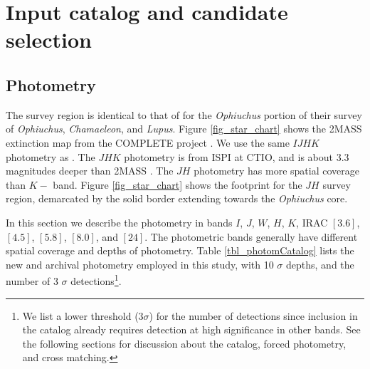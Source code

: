 \section{Input catalog and candidate selection}
\subsection{Photometry}
The survey region is identical to that of \cite{allers06} for the \emph{Ophiuchus} portion of their survey of \emph{Ophiuchus}, \emph{Chamaeleon}, and \emph{Lupus}.  Figure \ref{fig_star_chart} shows the 2MASS extinction map \citep{2008A&A...489..143L} from the COMPLETE project \citep{2006AJ....131.2921R}.  We use the same $IJHK$ photometry as \citet{allers06}.  The $JHK$ photometry is from ISPI at CTIO, and is about 3.3 magnitudes deeper than 2MASS \citep{allers06}.  The $JH$ photometry has more spatial coverage than $K-$ band.  Figure \ref{fig_star_chart} shows the footprint for the $JH$ survey region, demarcated by the solid border extending towards the \emph{Ophiuchus} core.

In this section we describe the photometry in bands $I$, $J$, $W$, $H$, $K$, IRAC $[3.6]$, $[4.5]$, $[5.8]$, $[8.0]$, and $[24]$.  The photometric bands generally have different spatial coverage and depths of photometry.  Table \ref{tbl_photomCatalog} lists the new and archival photometry employed in this study, with 10 $\sigma$ depths, and the number of 3 $\sigma$ detections\footnote{We list a lower threshold (3$ \sigma$) for the number of detections since inclusion in the catalog already requires detection at high significance in other bands.  See the following sections for discussion about the catalog, forced photometry, and cross matching.}.


